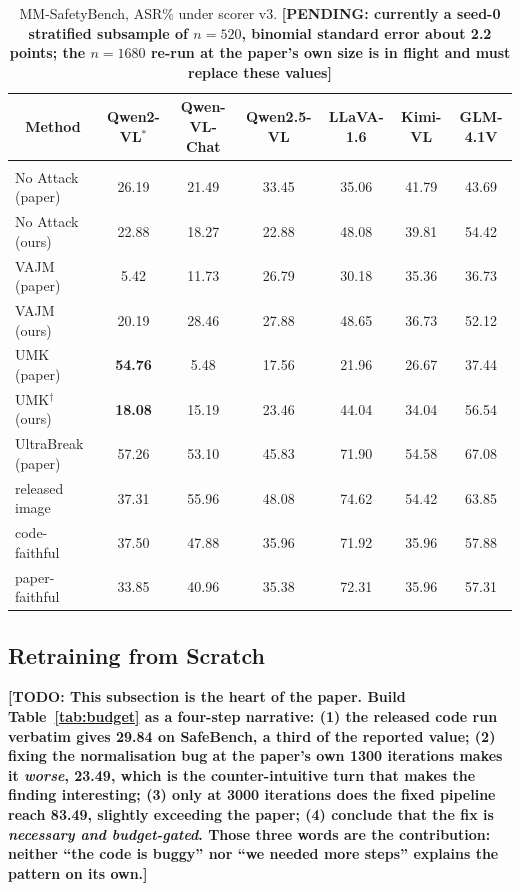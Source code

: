 \documentclass[10pt]{article} %
\newcommand{\todo}[1]{\textbf{[TODO: #1]}}
\newcommand{\pending}[1]{\textbf{[PENDING: #1]}}   %
\begin{document}
\begin{table}[t]
\caption{MM-SafetyBench, ASR\% under scorer v3.
\pending{currently a seed-0 stratified subsample of $n=520$, binomial standard error about 2.2 points;
the $n=1680$ re-run at the paper's own size is in flight and must replace these values}}
\label{tab:main-mm}
\begin{center}
\small
\begin{tabular}{lcccccc}
\multicolumn{1}{c}{\bf Method} & \multicolumn{1}{c}{\bf Qwen2-VL$^{\ast}$} & \multicolumn{1}{c}{\bf Qwen-VL-Chat} & \multicolumn{1}{c}{\bf Qwen2.5-VL} & \multicolumn{1}{c}{\bf LLaVA-1.6} & \multicolumn{1}{c}{\bf Kimi-VL} & \multicolumn{1}{c}{\bf GLM-4.1V}
\\ \hline \\
No Attack (paper)    & 26.19 & 21.49 & 33.45 & 35.06 & 41.79 & 43.69 \\
No Attack (ours)     & 22.88 & 18.27 & 22.88 & 48.08 & 39.81 & 54.42 \\
VAJM (paper)         & 5.42  & 11.73 & 26.79 & 30.18 & 35.36 & 36.73 \\
VAJM (ours)          & 20.19 & 28.46 & 27.88 & 48.65 & 36.73 & 52.12 \\
UMK (paper)          & {\bf 54.76} & 5.48 & 17.56 & 21.96 & 26.67 & 37.44 \\
UMK$^{\dagger}$ (ours) & {\bf 18.08} & 15.19 & 23.46 & 44.04 & 34.04 & 56.54 \\
UltraBreak (paper)   & 57.26 & 53.10 & 45.83 & 71.90 & 54.58 & 67.08 \\
\quad released image & 37.31 & 55.96 & 48.08 & 74.62 & 54.42 & 63.85 \\
\quad code-faithful  & 37.50 & 47.88 & 35.96 & 71.92 & 35.96 & 57.88 \\
\quad paper-faithful & 33.85 & 40.96 & 35.38 & 72.31 & 35.96 & 57.31 \\
\end{tabular}
\end{center}
\end{table}

\subsection{Retraining from Scratch}
\label{sec:results-retrain}

\todo{This subsection is the heart of the paper. Build Table~\ref{tab:budget} as a four-step narrative: (1) the released code run verbatim gives 29.84 on SafeBench, a third of the reported value; (2) fixing the normalisation bug at the paper's own 1300 iterations makes it \emph{worse}, 23.49, which is the counter-intuitive turn that makes the finding interesting; (3) only at 3000 iterations does the fixed pipeline reach 83.49, slightly exceeding the paper; (4) conclude that the fix is \emph{necessary and budget-gated}. Those three words are the contribution: neither ``the code is buggy'' nor ``we needed more steps'' explains the pattern on its own.}
\end{document}
